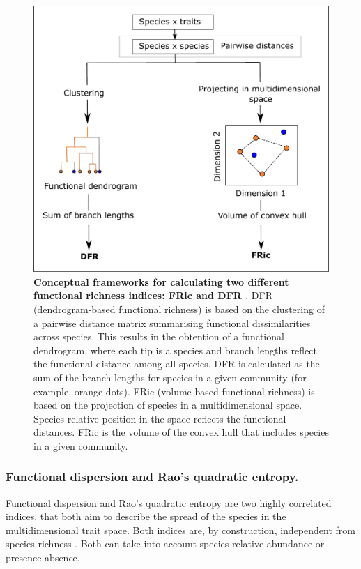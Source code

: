 \begin{figure}[h!]
\centering
\includegraphics[scale=0.5]{figures/chapter3/DFR_FRic_chart}
\caption[Conceptual frameworks for calculating two different functional richness indices: FRic and DFR]{\textbf{Conceptual frameworks for calculating two different functional richness indices: FRic \citep{Villeger2008} and DFR \citep{Petchey2002}}. DFR (dendrogram-based functional richness) is based on the clustering of a pairwise distance matrix summarising functional dissimilarities across species. This results in the obtention of a functional dendrogram, where each tip is a species and branch lengths reflect the functional distance among all species. DFR is calculated as the sum of the branch lengths for species in a given community (for example, orange dots). FRic (volume-based functional richness) is based on the projection of species in a multidimensional space. Species relative position in the space reflects the functional distances. FRic is the volume of the convex hull that includes species in a given community.} 
\label{chartFR_calc}
\end{figure}


\subsubsection{Functional dispersion and Rao's quadratic entropy.}
Functional dispersion \citep{Laliberte2010} and Rao's quadratic entropy \citep{Rao1982, Botta-Dukat2009} are two highly correlated indices, that both aim to describe the spread of the species in the multidimensional trait space. 
Both indices are, by construction, independent from species richness \citep{Schleuter2010}. Both can take into account species relative abundance or presence-absence.


